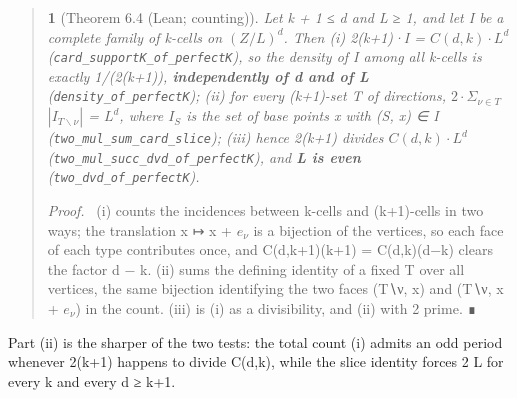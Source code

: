 \documentclass[11pt,a4paper]{article}
\theoremstyle{named}
\newtheorem*{namedthm}{}
\newenvironment{mdproof}[1][Proof]{\par\medskip\noindent\textit{#1.}\ }{\par\medskip}
\begin{document}
\begin{quote}
\begin{namedthm}[Theorem 6.4 (Lean; counting)]
Let k + 1 ≤ d and L ≥ 1, and let I be a complete family of k-cells on $(Z/L)^d$. Then (i) 2(k+1)·\textbar{}I\textbar{} = $C(d,k)·L^d$ (\texttt{card\_\allowbreak{}supportK\_\allowbreak{}of\_\allowbreak{}perfectK}), so the density of I among all k-cells is exactly 1/(2(k+1)), \textbf{independently of d and of L} (\texttt{density\_\allowbreak{}of\_\allowbreak{}perfectK}); (ii) for every (k+1)-set T of directions, $2·Σ_{ν ∈ T}$ $|I_{T∖ν}|$ = $L^d$, where $I_S$ is the set of base points x with (S, x) ∈ I (\texttt{two\_\allowbreak{}mul\_\allowbreak{}sum\_\allowbreak{}card\_\allowbreak{}slice}); (iii) hence 2(k+1) divides $C(d,k)·L^d$ (\texttt{two\_\allowbreak{}mul\_\allowbreak{}succ\_\allowbreak{}dvd\_\allowbreak{}of\_\allowbreak{}perfectK}), and \textbf{L is even} (\texttt{two\_\allowbreak{}dvd\_\allowbreak{}of\_\allowbreak{}perfectK}).
\end{namedthm}
\begin{mdproof}[Proof]
(i) counts the incidences between k-cells and (k+1)-cells in two ways; the translation x ↦ x + $e_{ν}$ is a bijection of the vertices, so each face of each type contributes once, and C(d,k+1)(k+1) = C(d,k)(d−k) clears the factor d − k. (ii) sums the defining identity of a fixed T over all vertices, the same bijection identifying the two faces (T∖ν, x) and (T∖ν, x + $e_{ν}$) in the count. (iii) is (i) as a divisibility, and (ii) with 2 prime. ∎
\end{mdproof}
\end{quote}
Part (ii) is the sharper of the two tests: the total count (i) admits an odd period whenever 2(k+1) happens to divide C(d,k), while the slice identity forces 2 \textbar{} L for every k and every d ≥ k+1.
\end{document}
